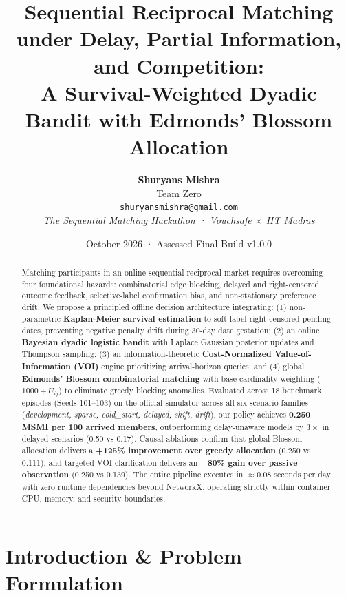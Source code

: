\documentclass[10pt,twocolumn,letterpaper]{article}
\title{\textbf{\Large Sequential Reciprocal Matching under Delay, Partial Information, and Competition:}\\
\large A Survival-Weighted Dyadic Bandit with Edmonds' Blossom Allocation}
\author{
  \textbf{Shuryans Mishra} \\
  Team Zero \\
  \texttt{shuryansmishra@gmail.com} \\
  \textit{The Sequential Matching Hackathon · Vouchsafe $\times$ IIT Madras}
}
\date{October 2026 · Assessed Final Build v1.0.0}
\begin{document}
\maketitle

\begin{abstract}
Matching participants in an online sequential reciprocal market requires overcoming four foundational hazards: combinatorial edge blocking, delayed and right-censored outcome feedback, selective-label confirmation bias, and non-stationary preference drift. We propose a principled offline decision architecture integrating: (1) non-parametric \textbf{Kaplan-Meier survival estimation} to soft-label right-censored pending dates, preventing negative penalty drift during 30-day date gestation; (2) an online \textbf{Bayesian dyadic logistic bandit} with Laplace Gaussian posterior updates and Thompson sampling; (3) an information-theoretic \textbf{Cost-Normalized Value-of-Information (VOI)} engine prioritizing arrival-horizon queries; and (4) global \textbf{Edmonds' Blossom combinatorial matching} with base cardinality weighting ($1000 + U_{ij}$) to eliminate greedy blocking anomalies. Evaluated across 18 benchmark episodes (Seeds 101--103) on the official simulator across all six scenario families (\textit{development, sparse, cold\_start, delayed, shift, drift}), our policy achieves \textbf{0.250 MSMI per 100 arrived members}, outperforming delay-unaware models by $3\times$ in delayed scenarios (0.50 vs 0.17). Causal ablations confirm that global Blossom allocation delivers a \textbf{+125\% improvement over greedy allocation} (0.250 vs 0.111), and targeted VOI clarification delivers an \textbf{+80\% gain over passive observation} (0.250 vs 0.139). The entire pipeline executes in $\approx 0.08$ seconds per day with zero runtime dependencies beyond NetworkX, operating strictly within container CPU, memory, and security boundaries.
\end{abstract}

\section{Introduction \& Problem Formulation}
\label{sec:intro}
\end{document}
